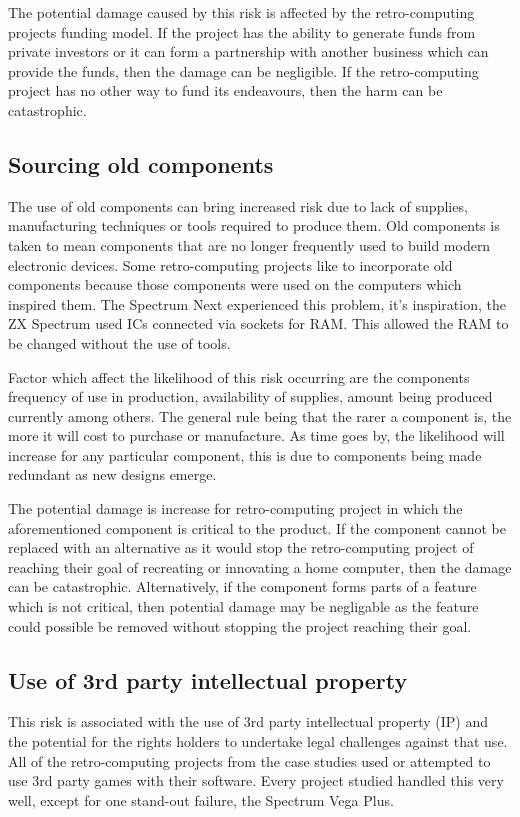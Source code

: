 The potential damage caused by this risk is affected by the retro-computing projects funding model. If the project has the ability to generate funds from private investors or it can form a partnership with another business which can provide the funds, then the damage can be negligible. If the retro-computing project has no other way to fund its endeavours, then the harm can be catastrophic. 


\subsection{Sourcing old components}
The use of old components can bring increased risk due to lack of supplies, manufacturing techniques or tools required to produce them. Old components is taken to mean components that are no longer frequently used to build modern electronic devices. Some retro-computing projects like to incorporate old components because those components were used on the computers which inspired them. The Spectrum Next experienced this problem, it's inspiration, the ZX Spectrum used ICs connected via sockets for RAM. This allowed the RAM to be changed without the use of tools. 

Factor which affect the likelihood of this risk occurring are the components frequency of use in production, availability of supplies, amount being produced currently among others. The general rule being that the rarer a component is, the more it will cost to purchase or manufacture. As time goes by, the likelihood will increase for any particular component, this is due to components being made redundant as new designs emerge.

The potential damage is increase for retro-computing project in which the aforementioned component is critical to the product. If the component cannot be replaced with an alternative as it would stop the retro-computing project of reaching their goal of recreating or innovating a home computer, then the damage can be catastrophic. Alternatively, if the component forms parts of a feature which is not critical, then potential damage may be negligable as the feature could possible be removed without stopping the project reaching their goal.


\subsection{Use of 3rd party intellectual property}
This risk is associated with the use of 3rd party intellectual property (IP) and the potential for the rights holders to undertake legal challenges against that use. All of the retro-computing projects from the case studies used or attempted to use 3rd party games with their software. Every project studied handled this very well, except for one stand-out failure, the Spectrum Vega Plus. 

